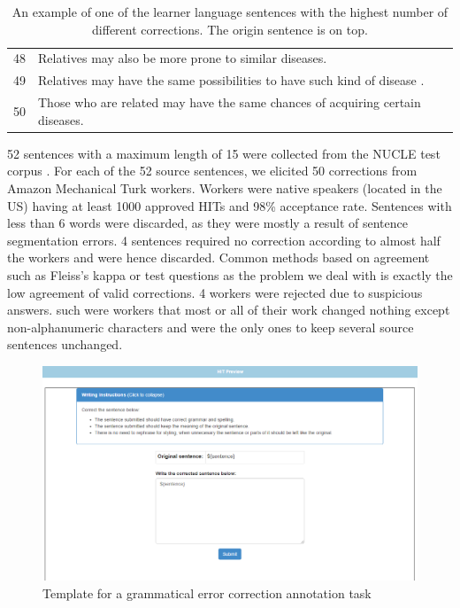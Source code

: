 \documentclass[letterpaper, 11pt]{article}
\begin{document}
\begin{table}[]
\begin{tabular}{ll}
		48                           & Relatives may also be more prone to similar diseases.                                 \\
		49                           & Relatives may have the same possibilities to have such kind of disease .              \\
		50                           & Those who are related may have the same chances of acquiring certain diseases.       
	\end{tabular}
	\caption{An example of one of the learner language sentences with the highest number of different corrections. The origin sentence is on top.}
\end{table}
52 sentences with a maximum length of 15 were collected from the NUCLE test corpus \cite{dahlmeier2013building}. 
For each of the 52 source sentences, 
we elicited 50 corrections from Amazon Mechanical Turk workers. Workers were native speakers (located in the US) having at least 1000 approved HITs and 98\% acceptance rate.
Sentences with less than 6 words were discarded, as they were mostly a result of sentence segmentation errors.
4 sentences required no correction according to almost half the workers and were hence discarded.
Common methods based on agreement such as Fleiss's kappa or test questions as the problem we deal with is exactly the low agreement of valid corrections.
4 workers were rejected due to suspicious answers. such were workers that most or all of their work changed nothing except non-alphanumeric characters and were the only ones to keep several source sentences unchanged. 

\begin{figure}[h!]
	\includegraphics[width=0.9\columnwidth]{correction_task}
	\caption{Template for a grammatical error correction annotation task} 
\end{figure}
\FloatBarrier
\end{document}
